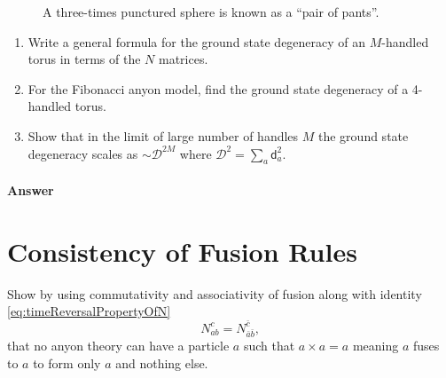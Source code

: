 \documentclass{book}
\begin{document}
\begin{figure}[h!]
\caption{A three-times punctured sphere is known as a ``pair of pants”.}
\label{fig:pairOfPants}
\end{figure}


\begin{enumerate}
\item Write a general formula for the ground state degeneracy of an $M$-handled torus in terms of the $N$ matrices.
\item For the Fibonacci anyon model, find the ground state degeneracy of a 4-handled torus.
\item Show that in the limit of large number of handles $M$ the ground state degeneracy scales as $\sim \mathcal{D}^{2M}$ where $\mathcal{D}^{2} =\sum _{a}\mathrm{\mathsf{d}}_{a}^{2}$.
\end{enumerate}

\paragraph{Answer}



\section{Consistency of Fusion Rules}
Show by using commutativity and associativity of fusion along with identity \eqref{eq:timeReversalPropertyOfN}
\begin{equation}
N_{ab}^{c} =N_{\bar{a}\bar{b}}^{\bar{c}} ,
\label{eq:timeReversalPropertyOfN}
\end{equation}
that no anyon theory can have a particle $a$ such that $a\times a=a$ meaning $a$ fuses to $a$ to form only $a$ and nothing else.
\end{document}
